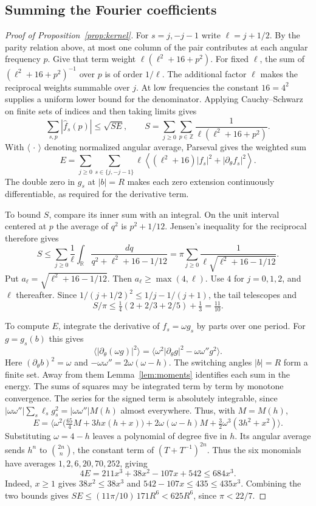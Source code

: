 \documentclass[11pt,reqno]{amsart}
\begin{document}
\subsection*{Summing the Fourier coefficients}
\begin{proof}[Proof of Proposition~\ref{prop:kernel}]
For \(s=j,-j-1\) write \(\ell=j+1/2\). By the parity relation above, at most one column of the pair contributes at each angular frequency \(p\). Give that term weight \(\ell(\ell^2+16+p^2)\). For fixed \(\ell\), the sum of \((\ell^2+16+p^2)^{-1}\) over \(p\) is of order \(1/\ell\). The additional factor \(\ell\) makes the reciprocal weights summable over \(j\). At low frequencies the constant \(16=4^2\) supplies a uniform lower bound for the denominator. Applying Cauchy--Schwarz on finite sets of indices and then taking limits gives
\[
 \sum_{s,p}|\widehat f_s(p)|\le\sqrt{SE},\qquad
 S=\sum_{j\ge0}\sum_{p\in\mathbb Z}\frac{1}{\ell(\ell^2+16+p^2)} .
\]
With \(\langle\,\cdot\,\rangle\) denoting normalized angular average, Parseval gives the weighted sum
\[
 E=\sum_{j\ge0}\sum_{s\in\{j,-j-1\}}
       \ell\left\langle(\ell^2+16)|f_s|^2+|\partial_\theta f_s|^2\right\rangle .
\]
The double zero in \(g_s\) at \(|b|=R\) makes each zero extension continuously differentiable, as required for the derivative term.

To bound \(S\), compare its inner sum with an integral. On the unit interval centered at \(p\) the average of \(q^2\) is \(p^2+1/12\). Jensen's inequality for the reciprocal therefore gives
\[
 S\le\sum_{j\ge0}\frac1\ell\int_{\mathbb R}
 \frac{dq}{q^2+\ell^2+16-1/12}
 =\pi\sum_{j\ge0}\frac1{\ell\sqrt{\ell^2+16-1/12}}.
\]
Put \(a_\ell=\sqrt{\ell^2+16-1/12}\). Then \(a_\ell\ge\max(4,\ell)\). Use \(4\) for \(j=0,1,2\), and \(\ell\) thereafter. Since \(1/(j+1/2)^2\le 1/j-1/(j+1)\), the tail telescopes and
\[
 S/\pi\le \tfrac14(2+2/3+2/5)+\tfrac13=\tfrac{11}{10}.
\]

To compute \(E\), integrate the derivative of \(f_s=\omega g_s\) by parts over one period. For \(g=g_s(b)\) this gives
\[
 \big\langle|\partial_\theta(\omega g)|^2\big\rangle
 =\big\langle \omega^2|\partial_\theta g|^2-\omega\omega''g^2\big\rangle .
\]
Here \((\partial_\theta b)^2=\omega\) and \(-\omega\omega''=2\omega(\omega-h)\). The switching angles \(|b|=R\) form a finite set. Away from them Lemma~\ref{lem:moments} identifies each sum in the energy. The sums of squares may be integrated term by term by monotone convergence. The series for the signed term is absolutely integrable, since \(|\omega\omega''|\sum_s\ell_s g_s^2=|\omega\omega''|M(h)\) almost everywhere. Thus, with \(M=M(h)\),
\[
 E=\Big\langle \omega^2\big(\tfrac{65}{4}M+3hx(h+x)\big)
      +2\omega(\omega-h)M+\tfrac32\omega^3(3h^2+x^2)\Big\rangle .
\]
Substituting \(\omega=4-h\) leaves a polynomial of degree five in \(h\). Its angular average sends \(h^n\) to \(\binom{2n}{n}\), the constant term of \((T+T^{-1})^{2n}\). Thus the six monomials have averages \(1,2,6,20,70,252\), giving
\[
 4E=211x^3+38x^2-107x+542\le684x^3 .
\]
Indeed, \(x\ge1\) gives \(38x^2\le38x^3\) and \(542-107x\le435\le435x^3\).
Combining the two bounds gives \(SE\le(11\pi/10)\,171R^6<625R^6\), since \(\pi<22/7\).
\end{proof}
\end{document}
